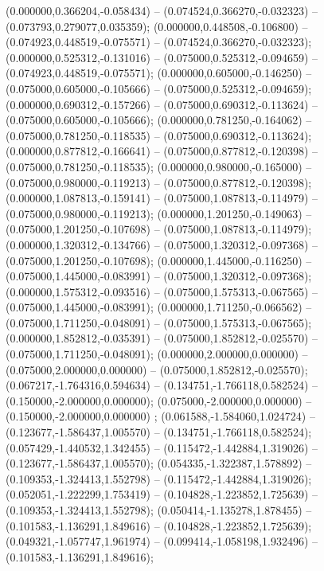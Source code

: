  (0.000000,0.366204,-0.058434) -- (0.074524,0.366270,-0.032323) -- (0.073793,0.279077,0.035359);
 (0.000000,0.448508,-0.106800) -- (0.074923,0.448519,-0.075571) -- (0.074524,0.366270,-0.032323);
 (0.000000,0.525312,-0.131016) -- (0.075000,0.525312,-0.094659) -- (0.074923,0.448519,-0.075571);
 (0.000000,0.605000,-0.146250) -- (0.075000,0.605000,-0.105666) -- (0.075000,0.525312,-0.094659);
 (0.000000,0.690312,-0.157266) -- (0.075000,0.690312,-0.113624) -- (0.075000,0.605000,-0.105666);
 (0.000000,0.781250,-0.164062) -- (0.075000,0.781250,-0.118535) -- (0.075000,0.690312,-0.113624);
 (0.000000,0.877812,-0.166641) -- (0.075000,0.877812,-0.120398) -- (0.075000,0.781250,-0.118535);
 (0.000000,0.980000,-0.165000) -- (0.075000,0.980000,-0.119213) -- (0.075000,0.877812,-0.120398);
 (0.000000,1.087813,-0.159141) -- (0.075000,1.087813,-0.114979) -- (0.075000,0.980000,-0.119213);
 (0.000000,1.201250,-0.149063) -- (0.075000,1.201250,-0.107698) -- (0.075000,1.087813,-0.114979);
 (0.000000,1.320312,-0.134766) -- (0.075000,1.320312,-0.097368) -- (0.075000,1.201250,-0.107698);
 (0.000000,1.445000,-0.116250) -- (0.075000,1.445000,-0.083991) -- (0.075000,1.320312,-0.097368);
 (0.000000,1.575312,-0.093516) -- (0.075000,1.575313,-0.067565) -- (0.075000,1.445000,-0.083991);
 (0.000000,1.711250,-0.066562) -- (0.075000,1.711250,-0.048091) -- (0.075000,1.575313,-0.067565);
 (0.000000,1.852812,-0.035391) -- (0.075000,1.852812,-0.025570) -- (0.075000,1.711250,-0.048091);
 (0.000000,2.000000,0.000000) -- (0.075000,2.000000,0.000000) -- (0.075000,1.852812,-0.025570);
 (0.067217,-1.764316,0.594634) -- (0.134751,-1.766118,0.582524) -- (0.150000,-2.000000,0.000000);
 (0.075000,-2.000000,0.000000) -- (0.150000,-2.000000,0.000000) ;
 (0.061588,-1.584060,1.024724) -- (0.123677,-1.586437,1.005570) -- (0.134751,-1.766118,0.582524);
 (0.057429,-1.440532,1.342455) -- (0.115472,-1.442884,1.319026) -- (0.123677,-1.586437,1.005570);
 (0.054335,-1.322387,1.578892) -- (0.109353,-1.324413,1.552798) -- (0.115472,-1.442884,1.319026);
 (0.052051,-1.222299,1.753419) -- (0.104828,-1.223852,1.725639) -- (0.109353,-1.324413,1.552798);
 (0.050414,-1.135278,1.878455) -- (0.101583,-1.136291,1.849616) -- (0.104828,-1.223852,1.725639);
 (0.049321,-1.057747,1.961974) -- (0.099414,-1.058198,1.932496) -- (0.101583,-1.136291,1.849616);
